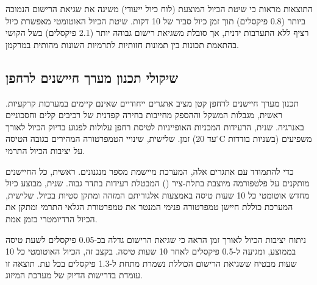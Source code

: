 \begin{table}[htbp]
\centering
\caption{השוואת שיטות כיול למצלמה חזותית ותרמית. (Comparison of calibration methods for visual and thermal cameras.)}
\label{tab:ch03_calibration_comparison}
\end{table}

התוצאות מראות כי שיטת הכיול המוצעת (לוח כיול ייעודי) משיגה את שגיאת הרישום הנמוכה ביותר (0.8 פיקסלים) תוך זמן כיול סביר של 10 דקות. שיטת הכיול האוטומטי מאפשרת כיול רציף ללא התערבות ידנית, אך סובלת משגיאת רישום גבוהה יותר (2.1 פיקסלים) בשל הקושי בהתאמת תכונות בין תמונות חזותיות לתרמיות השונות מהותית במרקמן.

\subsection{שיקולי תכנון מערך חיישנים לרחפן}
\label{sec:ch03_design_considerations}

תכנון מערך חיישנים לרחפן קטן מציב אתגרים ייחודיים שאינם קיימים במערכות קרקעיות. ראשית, מגבלות המשקל וההספק מחייבות בחירה קפדנית של רכיבים קלים וחסכוניים באנרגיה. שנית, הרעידות המכניות האופייניות לטיסת רחפן עלולות לפגוע בדיוק הכיול לאורך זמן. שלישית, שינויי הטמפרטורה המהירים בגובה הטיסה (עד 20$^{\circ}$C בשניות בודדות) משפיעים על יציבות הכיול התרמי.

כדי להתמודד עם אתגרים אלה, המערכת מיישמת מספר מנגנונים. ראשית, כל החיישנים מותקנים על פלטפורמה מיוצבת בתלת-ציר () המבטלת רעידות בתדר גבוה. שנית, מבוצע כיול מחדש אוטומטי כל 10 שעות טיסה באמצעות אלגוריתם  המזהה ומתקן סטיות בכיול. שלישית, המערכת כוללת חיישן טמפרטורה פנימי המנטר את טמפרטורת הגלאי התרמי ומתקן את הכיול הרדיומטרי בזמן אמת.

ניתוח יציבות הכיול לאורך זמן הראה כי שגיאת הרישום גדלה בכ-0.05 פיקסלים לשעת טיסה בממוצע, ומגיעה ל-0.5 פיקסלים לאחר 10 שעות טיסה. בקצב זה, הכיול האוטומטי כל 10 שעות מבטיח ששגיאת הרישום הכוללת נשמרת מתחת ל-1.3 פיקסלים בכל עת. תוצאה זו עומדת בדרישות הדיוק של מערכת המיזוג.

